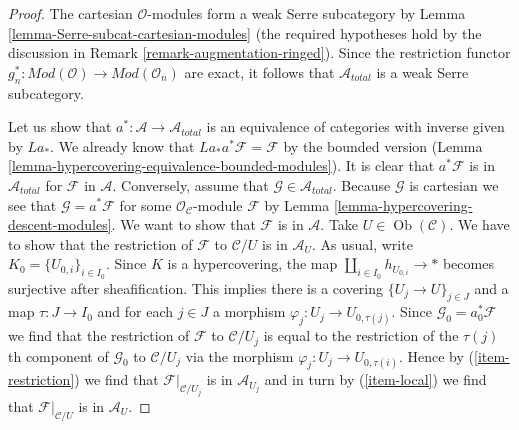 \documentclass{stacks-project}
\theoremstyle{plain}
\theoremstyle{definition}
\theoremstyle{remark}
\numberwithin{equation}{subsection}
\def\Ob{\mathop{\mathrm{Ob}}\nolimits}
\begin{document}
\begin{proof}
The cartesian $\mathcal{O}$-modules form a weak Serre subcategory by
Lemma \ref{lemma-Serre-subcat-cartesian-modules}
(the required hypotheses hold by the discussion in
Remark \ref{remark-augmentation-ringed}).
Since the restriction functor
$g_n^* : \textit{Mod}(\mathcal{O}) \to \textit{Mod}(\mathcal{O}_n)$
are exact, it follows that $\mathcal{A}_{total}$ is a weak Serre
subcategory.

\medskip\noindent
Let us show that $a^* : \mathcal{A} \to \mathcal{A}_{total}$
is an equivalence of categories with inverse given by $La_*$.
We already know that $La_*a^*\mathcal{F} = \mathcal{F}$ by the
bounded version
(Lemma \ref{lemma-hypercovering-equivalence-bounded-modules}).
It is clear that $a^*\mathcal{F}$ is in $\mathcal{A}_{total}$
for $\mathcal{F}$ in $\mathcal{A}$. Conversely, assume that
$\mathcal{G} \in \mathcal{A}_{total}$. Because $\mathcal{G}$
is cartesian we see that $\mathcal{G} = a^*\mathcal{F}$
for some $\mathcal{O}_\mathcal{C}$-module $\mathcal{F}$ by
Lemma \ref{lemma-hypercovering-descent-modules}.
We want to show that $\mathcal{F}$ is in $\mathcal{A}$.
Take $U \in \Ob(\mathcal{C})$. We have to show that the
restriction of $\mathcal{F}$ to $\mathcal{C}/U$ is in $\mathcal{A}_U$.
As usual, write $K_0 = \{U_{0, i}\}_{i \in I_0}$.
Since $K$ is a hypercovering, the map $\coprod_{i \in I_0} h_{U_{0, i}} \to *$
becomes surjective after sheafification. This implies there is
a covering $\{U_j \to U\}_{j \in J}$ and a map $\tau : J \to I_0$
and for each $j \in J$ a morphism $\varphi_j : U_j \to U_{0, \tau(j)}$.
Since $\mathcal{G}_0 = a_0^*\mathcal{F}$ we find
that the restriction of $\mathcal{F}$ to $\mathcal{C}/U_j$
is equal to the restriction of the $\tau(j)$th component of
$\mathcal{G}_0$ to $\mathcal{C}/U_j$ via the morphism
$\varphi_j : U_j \to U_{0, \tau(i)}$. Hence by
(\ref{item-restriction}) we find that $\mathcal{F}|_{\mathcal{C}/U_j}$
is in $\mathcal{A}_{U_j}$ and in turn by
(\ref{item-local}) we find that $\mathcal{F}|_{\mathcal{C}/U}$
is in $\mathcal{A}_U$.


\end{proof}
\end{document}
